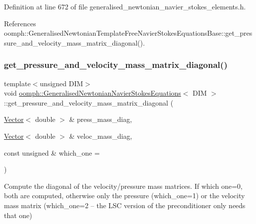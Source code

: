 Definition at line 672 of file generalised\+\_\+newtonian\+\_\+navier\+\_\+stokes\+\_\+elements.\+h.



References oomph\+::\+Generalised\+Newtonian\+Template\+Free\+Navier\+Stokes\+Equations\+Base\+::get\+\_\+pressure\+\_\+and\+\_\+velocity\+\_\+mass\+\_\+matrix\+\_\+diagonal().

\mbox{\label{classoomph_1_1GeneralisedNewtonianNavierStokesEquations_a6a7432333fec18d7e68efc3f99a02f16}} 
\subsubsection{\texorpdfstring{get\+\_\+pressure\+\_\+and\+\_\+velocity\+\_\+mass\+\_\+matrix\+\_\+diagonal()}{get\_pressure\_and\_velocity\_mass\_matrix\_diagonal()}}
{\footnotesize\ttfamily template$<$unsigned D\+IM$>$ \\
void \hyperlink{classoomph_1_1GeneralisedNewtonianNavierStokesEquations}{oomph\+::\+Generalised\+Newtonian\+Navier\+Stokes\+Equations}$<$ D\+IM $>$\+::get\+\_\+pressure\+\_\+and\+\_\+velocity\+\_\+mass\+\_\+matrix\+\_\+diagonal (\begin{DoxyParamCaption}\item[{\hyperlink{classoomph_1_1Vector}{Vector}$<$ double $>$ \&}]{press\+\_\+mass\+\_\+diag,  }\item[{\hyperlink{classoomph_1_1Vector}{Vector}$<$ double $>$ \&}]{veloc\+\_\+mass\+\_\+diag,  }\item[{const unsigned \&}]{which\+\_\+one = {} }\end{DoxyParamCaption})\hspace{0.3cm}{\ttfamily [virtual]}}



Compute the diagonal of the velocity/pressure mass matrices. If which one=0, both are computed, otherwise only the pressure (which\+\_\+one=1) or the velocity mass matrix (which\+\_\+one=2 -- the L\+SC version of the preconditioner only needs that one) 

